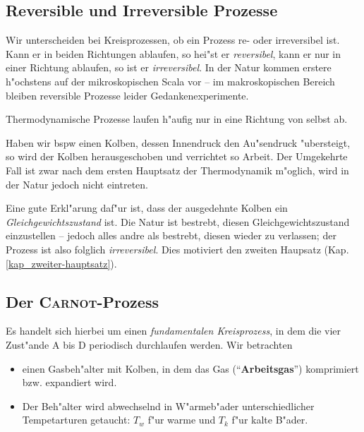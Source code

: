 \subsection{Reversible und Irreversible Prozesse}
\label{kap_reversible-und-irreversible-prozesse}

Wir unterscheiden bei Kreisprozessen, ob ein Prozess re- oder
irreversibel ist. Kann er in beiden Richtungen ablaufen, so hei"st er
\emph{reversibel}, kann er nur in einer Richtung ablaufen, so ist er
\emph{irreversibel}. In der Natur kommen erstere h"ochstens auf der
mikroskopischen Scala vor -- im makroskopischen Bereich bleiben
reversible Prozesse leider Gedankenexperimente.
\begin{Wichtig}
   Thermodynamische Prozesse laufen h"aufig nur in eine Richtung von
   selbst ab.
\end{Wichtig}

\begin{Beispiel}
   Haben wir bspw einen Kolben, dessen Innendruck den Au"sendruck
   "ubersteigt, so wird der Kolben herausgeschoben und verrichtet so
   Arbeit. Der Umgekehrte Fall ist zwar nach dem ersten Hauptsatz der
   Thermodynamik m"oglich, wird in der Natur jedoch nicht eintreten.
\end{Beispiel}


Eine gute Erkl"arung daf"ur ist, dass der ausgedehnte Kolben ein
\emph{Gleichgewichtszustand} ist. Die Natur ist bestrebt, diesen
Gleichgewichtszustand einzustellen -- jedoch alles andre als bestrebt,
diesen wieder zu verlassen; der Prozess ist also folglich
\emph{irreversibel}. Dies motiviert den zweiten Haupsatz
(Kap. \ref{kap_zweiter-hauptsatz}).







\subsection{Der \textsc{Carnot}-Prozess}
\label{kap_carnot-prozess}

Es handelt sich hierbei um einen \emph{fundamentalen
  Kreisprozess}, in dem die vier Zust"ande A bis D periodisch
durchlaufen werden. Wir betrachten 
\begin{itemize}
\item einen Gasbeh"alter mit Kolben, in dem das Gas
   ("`\textbf{Arbeitsgas}"') komprimiert bzw. expandiert wird.
\item Der Beh"alter wird abwechselnd in W"armeb"ader unterschiedlicher
   Tempetarturen getaucht: $T_w$ f"ur warme und $T_k$ f"ur kalte B"ader.
\end{itemize}


